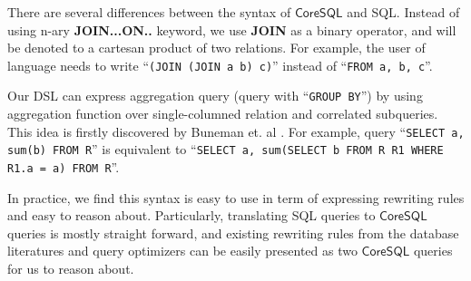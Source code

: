 There are several differences between the syntax of $\mathsf{CoreSQL}$ and SQL. Instead of using n-ary \textbf{JOIN...ON..} keyword, we use \textbf{JOIN} as a binary operator, and will be denoted to a cartesan product of two relations. For example, the user of language needs to write ``\lstinline[style=sql, keywords={}]{(JOIN (JOIN a b) c)}'' instead of ``\lstinline[style=sql, keywords={}]{FROM a, b, c}''.  

Our DSL can express aggregation query (query with ``\lstinline[style=sql, keywords={}]{GROUP BY}'') by
using aggregation function over single-columned relation and correlated subqueries. This idea is firstly discovered by Buneman et. al \cite{comp_syntax}. For example, query ``\lstinline[style=sql, keywords={}]{SELECT a, sum(b) FROM R}'' 
is equivalent to ``\lstinline[style=sql, keywords={}]{SELECT a, sum(SELECT b FROM R R1 WHERE R1.a = a) FROM R}''.


In practice, we find this syntax is easy to use in term of expressing 
rewriting rules and easy to reason about. Particularly, translating SQL queries to $\mathsf{CoreSQL}$ queries is mostly straight forward, and existing rewriting rules from the database 
literatures and query optimizers can be easily presented as two $\mathsf{CoreSQL}$ queries for us to reason about.

